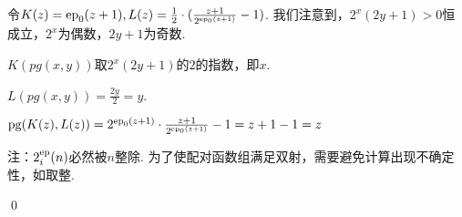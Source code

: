 \begin{pf} \rm 
    令$K(z)=\mathrm{ep}_0(z+1), L(z)=\frac{1}{2}\cdot(\frac{z+1}{2^{\mathrm{ep}_0(z+1)}}-1)$. 我们注意到，$2^x(2y+1)>0$恒成立，$2^x$为偶数，$2y+1$为奇数. 

    $K(pg(x,y))$取$2^x(2y+1)$的$2$的指数，即$x$.

    $L(pg(x,y))=\frac{2y}{2}=y$.

    $\mathrm{pg}(K(z), L(z))=2^{\mathrm{ep}_0(z+1)}\cdot\frac{z+1}{2^{\mathrm{ep}_0(z+1)}}-1=z+1-1=z$
    
    注：$2^{\mathrm{ep}}_i(n)$必然被$n$整除. 为了使配对函数组满足双射，需要避免计算出现不确定性，如取整. 

    \qed
\end{pf}
